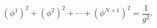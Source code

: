 \begin{equation}
(\phi^1)^2+(\phi^2)^2+\cdots +(\phi^{N+1})^2=\frac{1}{g^2}.
\label{Nsphere}
\end{equation}


